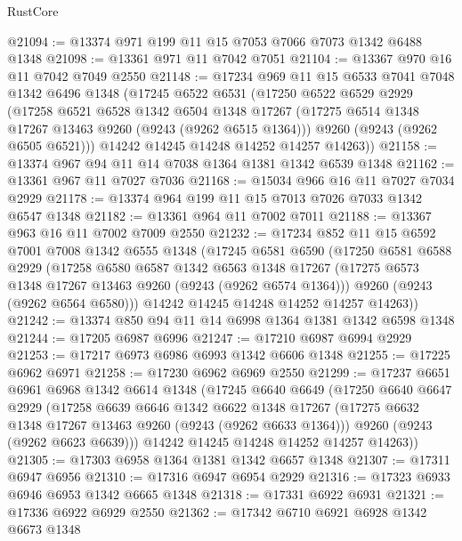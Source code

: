 \begin{lexlean}{RustCore}
\begin{coremodule}
@21094 := @13374 @971 @199 @11 @15 @7053 @7066 @7073 @1342 @6488 @1348
@21098 := @13361 @971 @11 @7042 @7051
@21104 := @13367 @970 @16 @11 @7042 @7049 @2550
@21148 := @17234
    @969
    @11
    @15
    @6533
    @7041
    @7048
    @1342
    @6496
    @1348
    (@17245
      @6522
      @6531
      (@17250
        @6522
        @6529
        @2929
        (@17258
          @6521
          @6528
          @1342
          @6504
          @1348
          @17267
          (@17275 @6514 @1348 @17267 @13463 @9260 (@9243 (@9262 @6515 @1364)))
          @9260
          (@9243 (@9262 @6505 @6521)))
        @14242
        @14245
        @14248
        @14252
        @14257
        @14263))
@21158 := @13374 @967 @94 @11 @14 @7038 @1364 @1381 @1342 @6539 @1348
@21162 := @13361 @967 @11 @7027 @7036
@21168 := @15034 @966 @16 @11 @7027 @7034 @2929
@21178 := @13374 @964 @199 @11 @15 @7013 @7026 @7033 @1342 @6547 @1348
@21182 := @13361 @964 @11 @7002 @7011
@21188 := @13367 @963 @16 @11 @7002 @7009 @2550
@21232 := @17234
    @852
    @11
    @15
    @6592
    @7001
    @7008
    @1342
    @6555
    @1348
    (@17245
      @6581
      @6590
      (@17250
        @6581
        @6588
        @2929
        (@17258
          @6580
          @6587
          @1342
          @6563
          @1348
          @17267
          (@17275 @6573 @1348 @17267 @13463 @9260 (@9243 (@9262 @6574 @1364)))
          @9260
          (@9243 (@9262 @6564 @6580)))
        @14242
        @14245
        @14248
        @14252
        @14257
        @14263))
@21242 := @13374 @850 @94 @11 @14 @6998 @1364 @1381 @1342 @6598 @1348
@21244 := @17205 @6987 @6996
@21247 := @17210 @6987 @6994 @2929
@21253 := @17217 @6973 @6986 @6993 @1342 @6606 @1348
@21255 := @17225 @6962 @6971
@21258 := @17230 @6962 @6969 @2550
@21299 := @17237
    @6651
    @6961
    @6968
    @1342
    @6614
    @1348
    (@17245
      @6640
      @6649
      (@17250
        @6640
        @6647
        @2929
        (@17258
          @6639
          @6646
          @1342
          @6622
          @1348
          @17267
          (@17275 @6632 @1348 @17267 @13463 @9260 (@9243 (@9262 @6633 @1364)))
          @9260
          (@9243 (@9262 @6623 @6639)))
        @14242
        @14245
        @14248
        @14252
        @14257
        @14263))
@21305 := @17303 @6958 @1364 @1381 @1342 @6657 @1348
@21307 := @17311 @6947 @6956
@21310 := @17316 @6947 @6954 @2929
@21316 := @17323 @6933 @6946 @6953 @1342 @6665 @1348
@21318 := @17331 @6922 @6931
@21321 := @17336 @6922 @6929 @2550
@21362 := @17342
    @6710
    @6921
    @6928
    @1342
    @6673
    @1348

\end{coremodule}
\end{lexlean}

